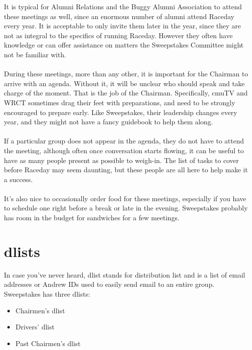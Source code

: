 It is typical for Alumni Relations and the Buggy Alumni Association to attend
these meetings as well, since an enormous number of alumni attend Raceday
every year. It is acceptable to only invite them later in the year, since
they are not as integral to the specifics of running Raceday. However they
often have knowledge or can offer assistance on matters the Sweepstakes
Committee might not be familiar with.
\\\\
During these meetings, more than any other, it is important for the Chairman
to arrive with an agenda. Without it, it will be unclear who should speak and
take charge of the moment. That is the job of the Chairman. Specifically, cmuTV
and WRCT sometimes drag their feet with preparations, and need to be strongly
encouraged to prepare early. Like Sweepstakes, their leadership changes every
year, and they might not have a fancy guidebook to help them along.
\\\\
If a particular group does not appear in the
agenda, they do not have to attend the meeting, although often once
conversation starts flowing, it can be useful to have as many people
present as possible to weigh-in. The list of tasks to cover before Raceday
may seem daunting, but these people are all here to help make it a success.
\\\\
It's also nice to occasionally order food for these meetings, especially if
you have to schedule one right before a break or late in the evening.
Sweepstakes probably has room in the budget for sandwiches for a few meetings.

\section{dlists}
\label{sec:dlists}
In case you've never heard, dlist stands for distribution list and is a
list of email addresses or Andrew IDs used to easily send email to an
entire group. Sweepstakes has three dlists:
\begin{itemize}
\item Chairmen's dlist
\item Drivers' dlist
\item Past Chairmen's dlist
\end{itemize}

